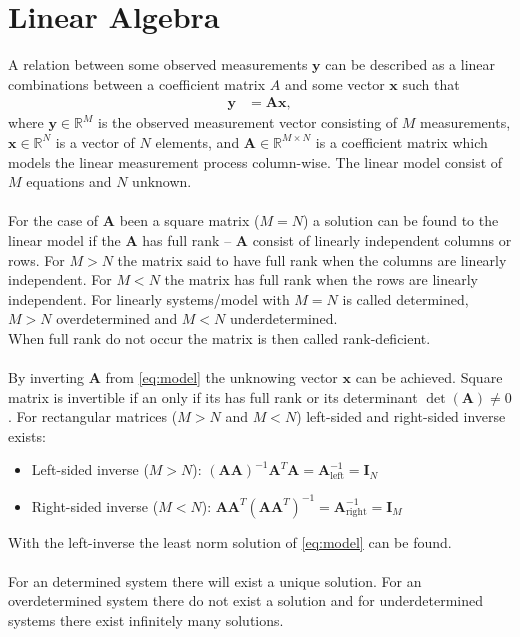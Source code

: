 \section{Linear Algebra}
A relation between some observed measurements $\mathbf{y}$ can be described as a linear combinations between a coefficient matrix $A$ and some vector $\mathbf{x}$ such that
\begin{align}\label{eq:model}
\mathbf{y} &= \mathbf{Ax},
\end{align}
where $\mathbf{y} \in \mathbb{R}^M$ is the observed measurement vector consisting of $M$ measurements, $\mathbf{x} \in \mathbb{R}^N$ is a vector of $N$ elements, and $\mathbf{A} \in \mathbb{R}^{M \times N}$ is a coefficient matrix which models the linear measurement process column-wise. The linear model consist of $M$ equations and $N$ unknown.
\\ \\
For the case of $\mathbf{A}$ been a square matrix ($M = N$) a solution can be found to the linear model if the $\mathbf{A}$ has full rank -- $\mathbf{A}$ consist of linearly independent columns or rows. For $M > N$ the matrix said to have full rank when the columns are linearly independent. For $M < N$ the matrix has full rank when the rows are linearly independent. For linearly systems/model with $M = N$ is called determined, $M > N$ overdetermined and $M < N$ underdetermined. 
\\
When full rank do not occur the matrix is then called rank-deficient.
\\ \\
By inverting $\mathbf{A}$ from \eqref{eq:model} the unknowing vector $\mathbf{x}$ can be achieved. Square matrix is invertible if an only if its has full rank or its determinant $\det(\mathbf{A}) \neq 0$. For rectangular matrices ($M > N$ and $M < N$) left-sided and right-sided inverse exists:
\begin{itemize}
\item Left-sided inverse ($M > N$): $(\mathbf{A} \mathbf{A})^{-1} \mathbf{A}^T \mathbf{A} = \mathbf{A}_{\text{left}}^{-1} = \mathbf{I}_N$ 
\item Right-sided inverse ($M < N$): $\mathbf{A} \mathbf{A}^T (\mathbf{A} \mathbf{A}^T)^{-1} = \mathbf{A}_{\text{right}}^{-1} = \mathbf{I}_M$ 
\end{itemize}
With the left-inverse the least norm solution of \eqref{eq:model} can be found.
\\ \\
For an determined system there will exist a unique solution. For an overdetermined system there do not exist a solution and for underdetermined systems there exist infinitely many solutions.
